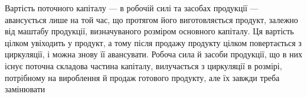 Вартість поточного капіталу — в робочій силі та засобах продукції — авансується лише на той час, що
протягом його виготовляється продукт, залежно від маштабу продукції, визначуваного розміром
основного капіталу. Ця вартість цілком увіходить у продукт, а тому після продажу продукту цілком
повертається з циркуляції, і можна знову її авансувати. Робоча сила й засоби продукції, що в них
існує поточна складова частина капіталу, вилучається з циркуляції в розмірі, потрібному на
вироблення й продаж готового продукту, але їх завжди треба замінювати
\parbreak{}  %
